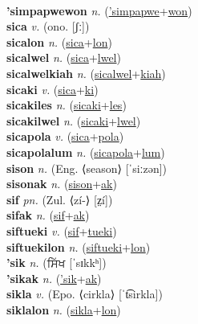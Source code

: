  \label{'simpapweak} \\
\textbf{'simpapwewon} \textit{n.} (\hyperref['simpapwe]{'simpapwe}+\hyperref[won]{won})
 \label{'simpapwewon} \\
\textbf{sica} \textit{v.} (ono. [ʃː])
 \label{sica} \\
\textbf{sicalon} \textit{n.} (\hyperref[sica]{sica}+\hyperref[lon]{lon})
 \label{sicalon} \\
\textbf{sicalwel} \textit{n.} (\hyperref[sica]{sica}+\hyperref[lwel]{lwel})
 \label{sicalwel} \\
\textbf{sicalwelkiah} \textit{n.} (\hyperref[sicalwel]{sicalwel}+\hyperref[kiah]{kiah})
 \label{sicalwelkiah} \\
\textbf{sicaki} \textit{v.} (\hyperref[sica]{sica}+\hyperref[ki]{ki})
 \label{sicaki} \\
\textbf{sicakiles} \textit{n.} (\hyperref[sicaki]{sicaki}+\hyperref[les]{les})
 \label{sicakiles} \\
\textbf{sicakilwel} \textit{n.} (\hyperref[sicaki]{sicaki}+\hyperref[lwel]{lwel})
 \label{sicakilwel} \\
\textbf{sicapola} \textit{v.} (\hyperref[sica]{sica}+\hyperref[pola]{pola})
 \label{sicapola} \\
\textbf{sicapolalum} \textit{n.} (\hyperref[sicapola]{sicapola}+\hyperref[lum]{lum})
 \label{sicapolalum} \\
\textbf{sison} \textit{n.} (Eng. ⟨season⟩ [ˈsiːzən])
 \label{sison} \\
\textbf{sisonak} \textit{n.} (\hyperref[sison]{sison}+\hyperref[ak]{ak})
 \label{sisonak} \\
\textbf{sif} \textit{pn.} (Zul. ⟨zí-⟩ [z̤í])
 \label{sif} \\
\textbf{sifak} \textit{n.} (\hyperref[sif]{sif}+\hyperref[ak]{ak})
 \label{sifak} \\
\textbf{siftueki} \textit{v.} (\hyperref[sif]{sif}+\hyperref[tueki]{tueki})
 \label{siftueki} \\
\textbf{siftuekilon} \textit{n.} (\hyperref[siftueki]{siftueki}+\hyperref[lon]{lon})
 \label{siftuekilon} \\
\textbf{'sik} \textit{n.} ({\gurmukhi{}ਸਿੱਖ} [ˈsɪkkʰ])
 \label{'sik} \\
\textbf{'sikak} \textit{n.} (\hyperref['sik]{'sik}+\hyperref[ak]{ak})
 \label{'sikak} \\
\textbf{sikla} \textit{v.} (Epo. ⟨cirkla⟩ [ˈt͡sirkla])
 \label{sikla} \\
\textbf{siklalon} \textit{n.} (\hyperref[sikla]{sikla}+\hyperref[lon]{lon})
